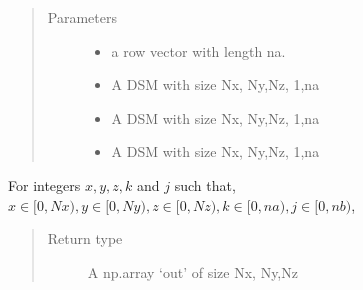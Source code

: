 \documentclass[letterpaper,10pt,english]{sphinxmanual}
\begin{document}
\begin{fulllineitems}
\begin{fulllineitems}
\begin{description}
\end{description}
\begin{quote}\begin{description}
\item[{Parameters}] \leavevmode\begin{itemize}
\item {} 
 \textendash{} a row vector with length na.

\item {} 
 \textendash{} A DSM with size Nx, Ny,Nz, 1,na

\item {} 
 \textendash{} A DSM with size Nx, Ny,Nz, 1,na

\item {} 
 \textendash{} A DSM with size Nx, Ny,Nz, 1,na

\end{itemize}

\end{description}\end{quote}

For integers \(x,y,z,k\) and \(j\) such that,
\(x \in [0,Nx), y \in [0,Ny), z \in [0,Nz), k \in [0,na),j \in [0,nb)\),

\begin{sphinxVerbatim}[commandchars=\\\{\}]
\PYG{p}{[}\PYG{p}{]}\PYG{p}{[}\PYG{p}{]}\PYG{p}{[}\PYG{p}{]}\PYG{p}{[}\PYG{p}{]}\PYG{p}{[}\PYG{p}{]}
\PYG{p}{[}\PYG{p}{]}\PYG{p}{[}\PYG{p}{]}\PYG{p}{[}\PYG{p}{]}\PYG{p}{[}\PYG{p}{]}\PYG{p}{[}\PYG{p}{]}
\end{sphinxVerbatim}
\begin{quote}\begin{description}
\item[{Return type}] \leavevmode
A np.array ‘out’ of size Nx, Ny,Nz


\end{description}
\end{quote}
\end{fulllineitems}
\end{fulllineitems}
\end{document}
